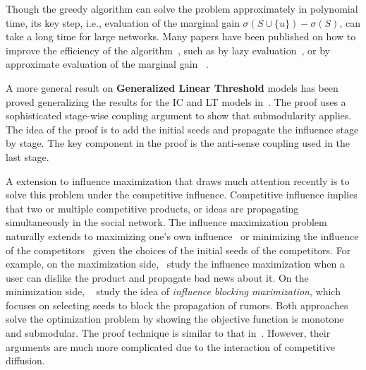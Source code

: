 Though the greedy algorithm can solve the problem approximately in polynomial time, its key step, i.e., evaluation of the marginal gain $\sigma(S\cup\{u\})-\sigma(S)$, can take a long time for large networks. Many papers have been published on how to improve the efficiency of the algorithm~\cite{Chen:2010,Leskovec:2007:COD:1281192.1281239,Goyal:2011:COG:1963192.1963217,DBLP:conf/icdm/ChenYZ10,Chen:2010:SIM:1835804.1835934}, such as by lazy evaluation~\cite{Leskovec:2007:COD:1281192.1281239,Goyal:2011:COG:1963192.1963217}, or by approximate evaluation of the marginal gain~\cite{Chen:2010,DBLP:conf/icdm/ChenYZ10,Chen:2010:SIM:1835804.1835934} .

A more general result on \textbf{Generalized Linear Threshold} models has been proved generalizing the results for the IC and LT models in~\cite{Mossel2007}. The proof uses a sophisticated stage-wise coupling argument to show that submodularity applies. The idea of the proof is to add the initial seeds and propagate the influence stage by stage. The key component in the proof is the anti-sense coupling used in the last stage.

A extension to influence maximization that draws much attention recently is to solve this problem under the competitive influence. Competitive influence implies that two or multiple competitive products, or ideas are propagating simultaneously in the social network. The influence maximization problem naturally extends to maximizing one's own influence~\cite{Bharathi:2007,Borodin:2010,chen2011influence} or
minimizing the influence of the competitors~\cite{he2012influence,Budak:2011} given the choices of the initial seeds of the competitors. For example, on the maximization side,~\cite{ChenCCKLRSWWY11} study the influence maximization when a user can dislike the product and propagate bad news about it. On the minimization side, ~\cite{HSCJ2012} study the idea of \textit{influence blocking maximization}, which focuses on selecting seeds to block the propagation of rumors. Both approaches solve the optimization problem by showing the objective function is monotone and submodular. The proof technique is similar to that in~\cite{KKT03}. However, their arguments are much more complicated due to the interaction of competitive diffusion.

